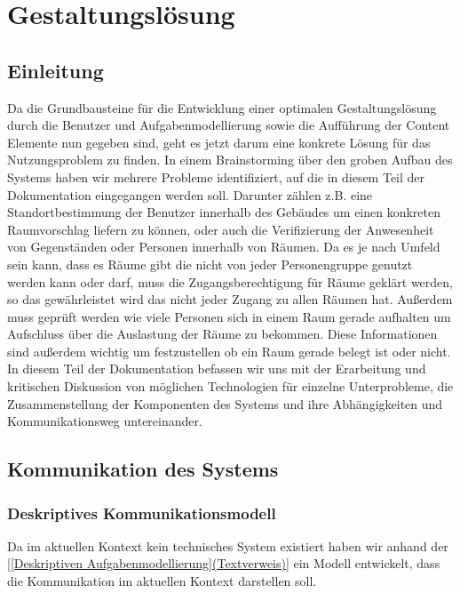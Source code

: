 \section{Gestaltungslösung}
\label{sec:Gestaltungslösung}

\subsection{Einleitung}
\label{sec:Gestaltungslösung_Einleitung}

Da die Grundbausteine für die Entwicklung einer optimalen Gestaltungslösung
durch die Benutzer und Aufgabenmodellierung sowie die Aufführung der Content
Elemente nun gegeben sind, geht es jetzt darum eine konkrete Lösung für das
Nutzungsproblem zu finden.
In einem Brainstorming über den groben Aufbau des Systems haben wir mehrere
Probleme identifiziert, auf die in diesem Teil der Dokumentation eingegangen
werden soll. Darunter zählen z.B. eine Standortbestimmung der Benutzer
innerhalb des Gebäudes um einen konkreten Raumvorschlag liefern zu können,
oder auch die Verifizierung der Anwesenheit von Gegenständen oder Personen
innerhalb von Räumen. Da es je nach Umfeld sein kann, dass es Räume gibt die
nicht von jeder Personengruppe genutzt werden kann oder darf, muss die
Zugangsberechtigung für Räume geklärt werden, so das gewährleistet wird das
nicht jeder Zugang zu allen Räumen hat. Außerdem muss geprüft werden wie viele
Personen sich in einem Raum gerade aufhalten um Aufschluss über die Auslastung
der Räume zu bekommen. Diese Informationen sind außerdem wichtig um
festzustellen ob ein Raum gerade belegt ist oder nicht. In diesem Teil der
Dokumentation befassen wir uns mit der Erarbeitung und kritischen Diskussion
von möglichen Technologien für einzelne Unterprobleme, die Zusammenstellung der
Komponenten des Systems und ihre Abhängigkeiten und Kommunikationsweg
untereinander.

\subsection{Kommunikation des Systems}
\label{sec:Kommunikation_des_Systems}

\subsubsection{Deskriptives Kommunikationsmodell}
\label{sec:Deskriptives_Kommunikationsmodell}

Da im aktuellen Kontext kein technisches System existiert haben wir anhand der
\ref{[Deskriptiven Aufgabenmodellierung](Textverweis)} ein Modell entwickelt,
dass die Kommunikation im aktuellen Kontext darstellen soll.

